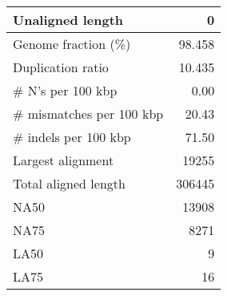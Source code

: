 \documentclass[12pt,a4paper]{article}
\begin{document}
\begin{table}[ht]
\begin{center}
\begin{tabular}{|l*{1}{|r}|}
Unaligned length & 0 \\ \hline
Genome fraction (\%) & 98.458 \\ \hline
Duplication ratio & 10.435 \\ \hline
\# N's per 100 kbp & 0.00 \\ \hline
\# mismatches per 100 kbp & 20.43 \\ \hline
\# indels per 100 kbp & 71.50 \\ \hline
Largest alignment & 19255 \\ \hline
Total aligned length & 306445 \\ \hline
NA50 & 13908 \\ \hline
NA75 & 8271 \\ \hline
LA50 & 9 \\ \hline
LA75 & 16 \\ \hline
\end{tabular}
\end{center}
\end{table}
\end{document}
